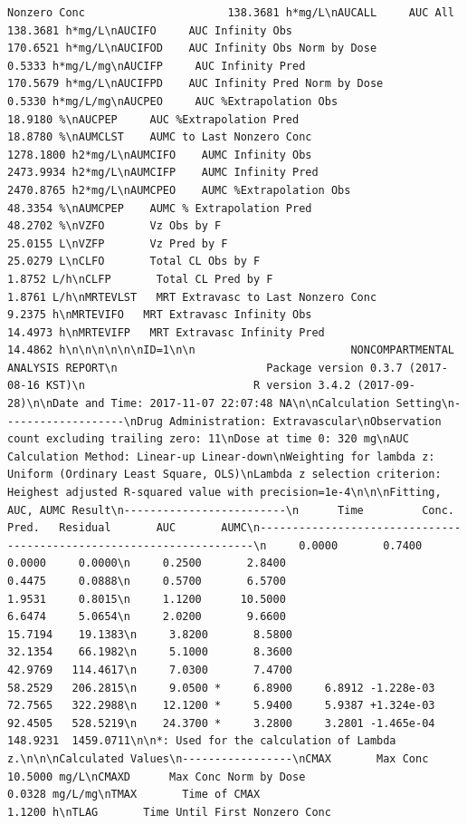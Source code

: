 \documentclass[12pt,]{krantz}
\theoremstyle{definition}
\theoremstyle{definition}
\theoremstyle{definition}
\theoremstyle{remark}
\begin{document}
\begin{verbatim}
Nonzero Conc                      138.3681 h*mg/L\nAUCALL     AUC All                                       138.3681 h*mg/L\nAUCIFO     AUC Infinity Obs                              170.6521 h*mg/L\nAUCIFOD    AUC Infinity Obs Norm by Dose                   0.5333 h*mg/L/mg\nAUCIFP     AUC Infinity Pred                             170.5679 h*mg/L\nAUCIFPD    AUC Infinity Pred Norm by Dose                  0.5330 h*mg/L/mg\nAUCPEO     AUC %Extrapolation Obs                         18.9180 %\nAUCPEP     AUC %Extrapolation Pred                        18.8780 %\nAUMCLST    AUMC to Last Nonzero Conc                    1278.1800 h2*mg/L\nAUMCIFO    AUMC Infinity Obs                            2473.9934 h2*mg/L\nAUMCIFP    AUMC Infinity Pred                           2470.8765 h2*mg/L\nAUMCPEO    AUMC %Extrapolation Obs                        48.3354 %\nAUMCPEP    AUMC % Extrapolation Pred                      48.2702 %\nVZFO       Vz Obs by F                                    25.0155 L\nVZFP       Vz Pred by F                                   25.0279 L\nCLFO       Total CL Obs by F                               1.8752 L/h\nCLFP       Total CL Pred by F                              1.8761 L/h\nMRTEVLST   MRT Extravasc to Last Nonzero Conc              9.2375 h\nMRTEVIFO   MRT Extravasc Infinity Obs                     14.4973 h\nMRTEVIFP   MRT Extravasc Infinity Pred                    14.4862 h\n\n\n\n\n\nID=1\n\n                        NONCOMPARTMENTAL ANALYSIS REPORT\n                       Package version 0.3.7 (2017-08-16 KST)\n                          R version 3.4.2 (2017-09-28)\n\nDate and Time: 2017-11-07 22:07:48 NA\n\nCalculation Setting\n-------------------\nDrug Administration: Extravascular\nObservation count excluding trailing zero: 11\nDose at time 0: 320 mg\nAUC Calculation Method: Linear-up Linear-down\nWeighting for lambda z: Uniform (Ordinary Least Square, OLS)\nLambda z selection criterion: Heighest adjusted R-squared value with precision=1e-4\n\n\nFitting, AUC, AUMC Result\n-------------------------\n      Time         Conc.      Pred.   Residual       AUC       AUMC\n---------------------------------------------------------------------\n     0.0000       0.7400                           0.0000     0.0000\n     0.2500       2.8400                           0.4475     0.0888\n     0.5700       6.5700                           1.9531     0.8015\n     1.1200      10.5000                           6.6474     5.0654\n     2.0200       9.6600                          15.7194    19.1383\n     3.8200       8.5800                          32.1354    66.1982\n     5.1000       8.3600                          42.9769   114.4617\n     7.0300       7.4700                          58.2529   206.2815\n     9.0500 *     6.8900     6.8912 -1.228e-03    72.7565   322.2988\n    12.1200 *     5.9400     5.9387 +1.324e-03    92.4505   528.5219\n    24.3700 *     3.2800     3.2801 -1.465e-04   148.9231  1459.0711\n\n*: Used for the calculation of Lambda z.\n\n\nCalculated Values\n-----------------\nCMAX       Max Conc                                       10.5000 mg/L\nCMAXD      Max Conc Norm by Dose                           0.0328 mg/L/mg\nTMAX       Time of CMAX                                    1.1200 h\nTLAG       Time Until First Nonzero Conc             
\end{verbatim}
\end{document}
